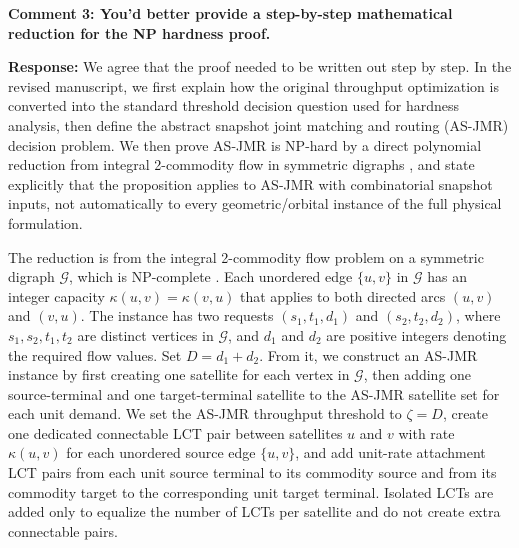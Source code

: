 \documentclass[journal,12pt,onecolumn,draftclsnofoot,]{IEEEtran}
\begin{document}
\textbf{Comment 3: You’d better provide a step-by-step mathematical reduction for the NP hardness proof.}

\textbf{Response:} We agree that the proof needed to be written out step by step. In the revised manuscript, we first explain how the original throughput optimization is converted into the standard threshold decision question used for hardness analysis, then define the abstract snapshot joint matching and routing (AS-JMR) decision problem. We then prove AS-JMR is NP-hard by a direct polynomial reduction from integral 2-commodity flow in symmetric digraphs \cite[Theorem 1]{jarry2012multiflows}, and state explicitly that the proposition applies to AS-JMR with combinatorial snapshot inputs, not automatically to every geometric/orbital instance of the full physical formulation.

The reduction is from the integral 2-commodity flow problem on a symmetric digraph $\mathcal{G}$, which is NP-complete \cite[Theorem 1]{jarry2012multiflows}. Each unordered edge $\{u,v\}$ in $\mathcal{G}$ has an integer capacity $\kappa(u,v)=\kappa(v,u)$ that applies to both directed arcs $(u,v)$ and $(v,u)$. The instance has two requests $(s_1,t_1,d_1)$ and $(s_2,t_2,d_2)$, where $s_1,s_2,t_1,t_2$ are distinct vertices in $\mathcal{G}$, and $d_1$ and $d_2$ are positive integers denoting the required flow values. Set $D=d_1+d_2$. From it, we construct an AS-JMR instance by first creating one satellite for each vertex in $\mathcal{G}$, then adding one source-terminal and one target-terminal satellite to the AS-JMR satellite set for each unit demand. We set the AS-JMR throughput threshold to $\zeta=D$, create one dedicated connectable LCT pair between satellites $u$ and $v$ with rate $\kappa(u,v)$ for each unordered source edge $\{u,v\}$, and add unit-rate attachment LCT pairs from each unit source terminal to its commodity source and from its commodity target to the corresponding unit target terminal. Isolated LCTs are added only to equalize the number of LCTs per satellite and do not create extra connectable pairs.
\end{document}
